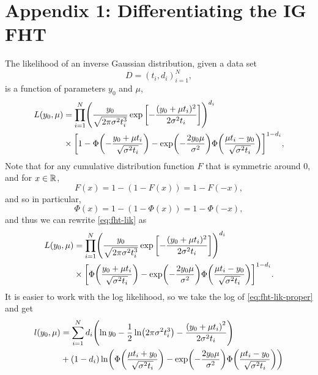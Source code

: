 \chapter{Appendix 1: Differentiating the IG FHT}\label{appendix}
The likelihood of an inverse Gaussian distribution, given a data set
\begin{equation}
    D=\left(t_i,d_i\right)_{i=1}^N,
\end{equation}
is a function of parameters $y_0$ and $\mu$,
\begin{align}\label{eq:fht-lik}
\begin{split}
L(y_0, \mu)&=\prod_{i=1}^N\p*{\frac{y_0}{\sqrt{2\pi\sigma^2\ti^3}}\exp\left[-\frac{(y_0+\mu \ti)^2}{2\sigma^2\ti}\right]}^{d_i}\\
&\times\sqb*{1-\Phi\p*{-\frac{y_0+\mu \ti}{\sqrt{\sigma^2\ti}}}-\exp\p*{-\frac{2y_0\mu}{\sigma^2}}\Phi\p*{\frac{\mu \ti-y_0}{\sqrt{\sigma^2\ti}}}}^{1-d_i},
\end{split}
\end{align}
Note that for any cumulative distribution function $F$ that is symmetric around 0, and for $x\in\mathbb{R}$,
\begin{equation}
    F(x)=1-(1-F(x))=1-F(-x),
\end{equation}
and so in particular,
\begin{equation}
    \Phi(x)=1-(1-\Phi(x))=1-\Phi(-x),
\end{equation}
and thus we can rewrite \eqref{eq:fht-lik} as
\begin{align}\label{eq:fht-lik-proper}
\begin{split}
L(y_0, \mu)&=\prod_{i=1}^N\p*{\frac{y_0}{\sqrt{2\pi\sigma^2\ti^3}}\exp\left[-\frac{(y_0+\mu \ti)^2}{2\sigma^2\ti}\right]}^{d_i}\\
&\times\sqb*{\Phi\p*{\frac{y_0+\mu \ti}{\sqrt{\sigma^2\ti}}}-\exp\p*{-\frac{2y_0\mu}{\sigma^2}}\Phi\p*{\frac{\mu \ti-y_0}{\sqrt{\sigma^2\ti}}}}^{1-d_i}.
\end{split}
\end{align}
It is easier to work with the log likelihood, so we take the log of \eqref{eq:fht-lik-proper} and get
\begin{align}\label{eq:fht-loglik}
\begin{split}
    l(y_0, \mu)&=\sum_{i=1}^Nd_i\p*{\ln y_0-\frac{1}{2}\ln\p*{2\pi\sigma^2\ti^3}-\frac{\p*{y_0+\mu\ti}^2}{2\sigma^2\ti}} \\
    &+
    (1-d_i)\ln\p*{\Phi\p*{\frac{\mu\ti+y_0}{\sqrt{\sigma^2\ti}}}-\exp\p*{-\frac{2y_0\mu}{\sigma^2}}\Phi\p*{\frac{\mu\ti-y_0}{\sqrt{\sigma^2\ti}}}}
\end{split}
\end{align}
